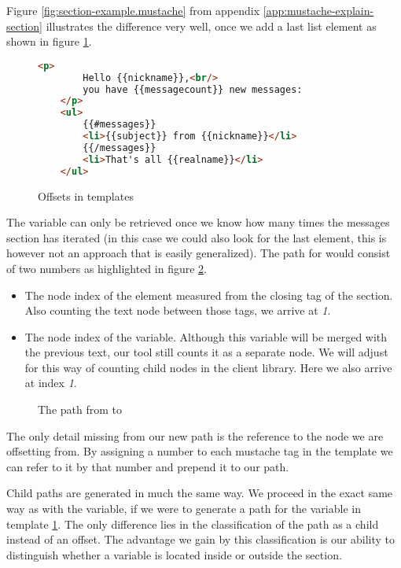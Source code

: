 \documentclass[thesis.tex]{subfiles}
\begin{document}
Figure \ref{fig:section-example.mustache} from
appendix \ref{app:mustache-explain-section} illustrates the difference
very well, once we add a last list element as shown in
figure \ref{fig:offsets.mustache}.
\begin{figure}
	\centering
	\begin{lstlisting}[language=HTML]
	<p>
		Hello {{nickname}},<br/>
		you have {{messagecount}} new messages:
	</p>
	<ul>
		{{#messages}}
		<li>{{subject}} from {{nickname}}</li>
		{{/messages}}
		<li>That's all {{realname}}</li>
	</ul>
	\end{lstlisting}
	\caption{Offsets in templates}
	\label{fig:offsets.mustache}
\end{figure}
The  variable can only be retrieved once we know how
many times the messages section has iterated (in this case we could also look
for the last  element, this is however not an approach that is
easily generalized). The path for  would consist of
two numbers as highlighted in figure \ref{fig:messages.ast}.
\begin{itemize}
\item The node index of the  element measured from
      the closing tag of the  section.
      Also counting the text node between those tags, we arrive at \emph{1}.
\item The node index of the  variable. Although this
      variable will be merged with the previous text, our tool still counts it
      as a separate node. We will adjust for this way of counting child nodes in
      the client library. Here we also arrive at index \emph{1}.
\end{itemize}

\begin{figure}
	\centering
	\resizebox{\linewidth}{!}{}
	\caption{The path from  to }
	\label{fig:messages.ast}
\end{figure}

The only detail missing from our new path is the reference to the node we are
offsetting from. By assigning a number to each mustache tag in the template we
can refer to it by that number and prepend it to our path.

Child paths are generated in much the same way. We proceed in the exact same way
as with the  variable, if we were to generate a path
for the  variable in template \ref{fig:offsets.mustache}.
The only difference lies in the classification of the path as a child instead of
an offset.
The advantage we gain by this classification is our ability to distinguish
whether a variable is located inside or outside the section.
\end{document}
